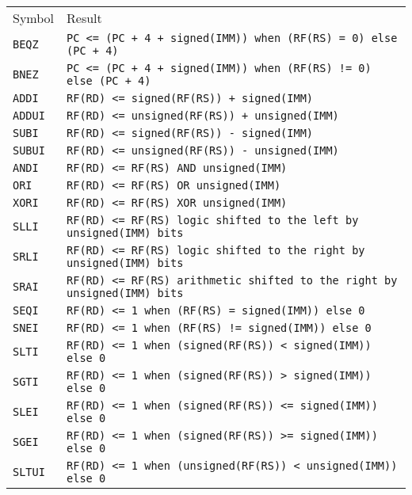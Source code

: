 \begin{table}[H]
	\centering
	\begin{tabular}{ll}
		\hline
		\rowcolor{gray!50}
		Symbol & Result \\
		\texttt{BEQZ} & \texttt{PC <= (PC + 4 + signed(IMM)) when (RF(RS) = 0) else (PC + 4)} \\
		\rowcolor{gray!25}
		\texttt{BNEZ} & \texttt{PC <= (PC + 4 + signed(IMM)) when (RF(RS) != 0) else (PC + 4)} \\
		\texttt{ADDI} & \texttt{RF(RD) <= signed(RF(RS)) + signed(IMM)} \\
		\rowcolor{gray!25}
		\texttt{ADDUI} & \texttt{RF(RD) <= unsigned(RF(RS)) + unsigned(IMM)} \\
		\texttt{SUBI} & \texttt{RF(RD) <= signed(RF(RS)) - signed(IMM)} \\
		\rowcolor{gray!25}
		\texttt{SUBUI} & \texttt{RF(RD) <= unsigned(RF(RS)) - unsigned(IMM)} \\
		\texttt{ANDI} & \texttt{RF(RD) <= RF(RS) AND unsigned(IMM)} \\
		\rowcolor{gray!25}
		\texttt{ORI} & \texttt{RF(RD) <= RF(RS) OR unsigned(IMM)} \\
		\texttt{XORI} & \texttt{RF(RD) <= RF(RS) XOR unsigned(IMM)} \\
		\rowcolor{gray!25}
		\texttt{SLLI} & \texttt{RF(RD) <= RF(RS) logic shifted to the left by unsigned(IMM) bits} \\
		\texttt{SRLI} & \texttt{RF(RD) <= RF(RS) logic shifted to the right by unsigned(IMM) bits} \\
		\rowcolor{gray!25}
		\texttt{SRAI} & \texttt{RF(RD) <= RF(RS) arithmetic shifted to the right by unsigned(IMM) bits} \\
		\texttt{SEQI} & \texttt{RF(RD) <= 1 when (RF(RS) = signed(IMM)) else 0} \\
		\rowcolor{gray!25}
		\texttt{SNEI} & \texttt{RF(RD) <= 1 when (RF(RS) != signed(IMM)) else 0} \\
		\texttt{SLTI} & \texttt{RF(RD) <= 1 when (signed(RF(RS)) < signed(IMM)) else 0} \\
		\rowcolor{gray!25}
		\texttt{SGTI} & \texttt{RF(RD) <= 1 when (signed(RF(RS)) > signed(IMM)) else 0} \\
		\texttt{SLEI} & \texttt{RF(RD) <= 1 when (signed(RF(RS)) <= signed(IMM)) else 0} \\
		\rowcolor{gray!25}
		\texttt{SGEI} & \texttt{RF(RD) <= 1 when (signed(RF(RS)) >= signed(IMM)) else 0} \\
		\texttt{SLTUI} & \texttt{RF(RD) <= 1 when (unsigned(RF(RS)) < unsigned(IMM)) else 0} \\

\end{tabular}
\end{table}
